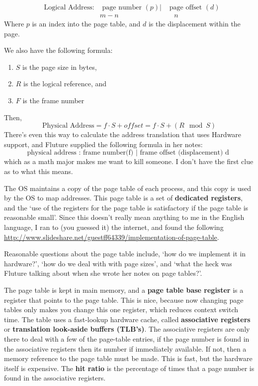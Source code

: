 \documentclass{article}
\begin{document}
\begin{align*}
&\text{Logical Address:} &\text{ page number } (p) | & \text{ page offset }(d)\\
&&m-n   & \quad  n
\end{align*}
Where $p$ is an index into the page table, and $d$ is the displacement within the page. 

We also have the following formula: 
\begin{enumerate}
\item $S$ is the page size in bytes,
\item $R$ is the logical reference, and
\item $F$ is the frame number
\end{enumerate}
Then,
\[
\text{Physical Address} = f\cdot S + offset = f\cdot S +( R\mod S)
\]
There's even this way to calculate the address translation that uses Hardware support, and Fluture supplied the following formula in her notes:
\[
\text{physical address : frame number(f) | frame offset (displacement) d }
\]
which as a math major makes me want to kill someone. I don't have the first clue as to what this means.

The OS maintains a copy of the page table of each process, and this copy is used by the OS to map addresses. This page table is a set of {\bf dedicated registers}, and the `use of the registers for the page table is satisfactory if the page table is reasonable small'. Since this doesn't really mean anything to me in the English language, I ran to (you guessed it) the internet, and found the following \url{http://www.slideshare.net/guestff64339/implementation-of-page-table}. 

Reasonable questions about the page table include, `how do we implement it in hardware?', `how do we deal with with page sizes', and `what the heck was Fluture talking about when she wrote her notes on page tables?'. 

The page table is kept in main memory, and a {\bf page table base register} is a register that points to the page table. This is nice, because now changing page tables only makes you change this one register, which reduces context switch time. The table uses a fast-lookup hardware cache, called {\bf associative registers} or {\bf translation look-aside buffers (TLB's)}. The associative registers are only there to deal with a few of the page-table entries, if the page number is found in the associative registers then its number if immediately available. If not, then a memory reference to the page table must be made. This is fast, but the hardware itself is expensive. The {\bf hit ratio} is the percentage of times that a page number is found in the associative registers. 
\end{document}
